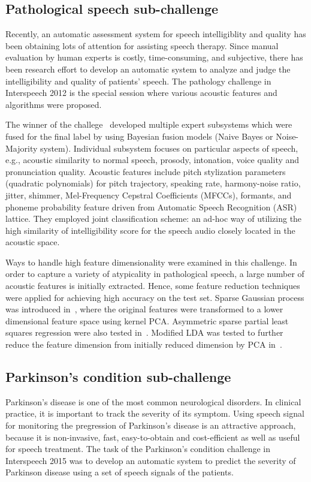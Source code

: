\documentclass{article}
\begin{document}
\subsection{Pathological speech sub-challenge}
Recently, an automatic assessment system for speech intelligiblity and quality has been obtaining lots of attention for assisting speech therapy.
Since manual evaluation by human experts is costly, time-consuming, and subjective, there has been research effort to develop an automatic system to analyze and judge the intelligibility and quality of patients' speech.
The pathology challenge in Interspeech 2012 is the special session where various acoustic features and algorithms were proposed.

The winner of the challege~\cite{kim2012intelligibility} developed multiple expert subsystems which were fused for the final label by using Bayesian fusion models (Naive Bayes or Noise-Majority system).
Individual subsystem focuses on particular aspects of speech, e.g., acoustic similarity to normal speech, prosody, intonation, voice quality and pronunciation quality.
Acoustic features include pitch stylization parameters (quadratic polynomials) for pitch trajectory, speaking rate, harmony-noise ratio, jitter, shimmer, Mel-Frequency Cepstral Coefficients (MFCCs), formants, and phoneme probability feature driven from Automatic Speech Recognition (ASR) lattice.
They employed joint classification scheme: an ad-hoc way of utilizing the high similarity of intelligibility score for the speech audio closely located in the acoustic space.

Ways to handle high feature dimensionality were examined in this challenge.
In order to capture a variety of atypicality in pathological speech, a large number of acoustic features is initially extracted.
Hence, some feature reduction techniques were applied for achieving high accuracy on the test set.
Sparse Gaussian process was introduced in~\cite{lu2012predicting}, where the original features were transformed to a lower dimensional feature space using kernel PCA.
Asymmetric sparse partial least squares regression were also tested in~\cite{huang2012detecting}.
Modified LDA was tested to further reduce the feature dimension from initially reduced dimension by PCA in~\cite{zhou2012automatic}.

\subsection{Parkinson's condition sub-challenge}
Parkinson's disease is one of the most common neurological disorders.
In clinical practice, it is important to track the severity of its symptom.
Using speech signal for monitoring the pregression of Parkinson's disease is an attractive approach, because it is non-invasive, fast, easy-to-obtain and cost-efficient as well as useful for speech treatment.
The task of the Parkinson's condition challenge in Interspeech 2015 was to develop an automatic system to predict the severity of Parkinson disease using a set of speech signals of the patients.
\end{document}
